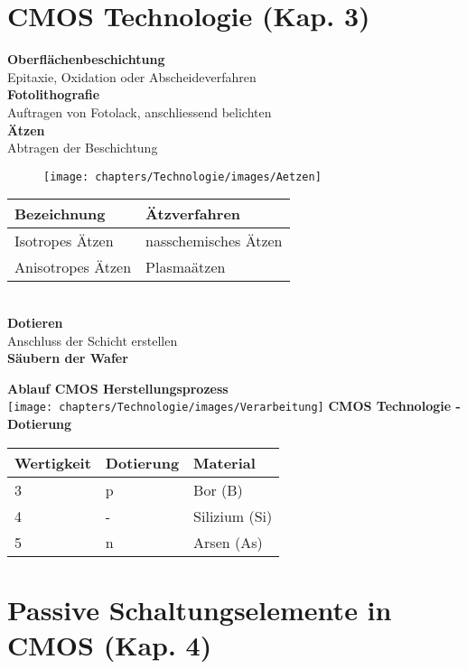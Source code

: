 
\section{CMOS Technologie (Kap. 3)}

\begin{minipage}[t]{0.5\textwidth}
	\textbf{Oberflächenbeschichtung}\\
	Epitaxie, Oxidation oder Abscheideverfahren\\ [2ex]
	\textbf{Fotolithografie}\\
	Auftragen von Fotolack, anschliessend belichten\\ [2ex]
	\textbf{Ätzen}\\
	Abtragen der Beschichtung
	\begin{figure}[H]
		\texttt{[image: chapters/Technologie/images/Aetzen]}
	\end{figure}
	\begin{tabular}{|l|l|}
		\hline
		\textbf{Bezeichnung}&\textbf{Ätzverfahren}\\ \hline
		Isotropes Ätzen&nasschemisches Ätzen\\ \hline
		Anisotropes Ätzen&Plasmaätzen\\ \hline
	\end{tabular}\\ [2ex]
	\textbf{Dotieren}\\
	Anschluss der Schicht erstellen\\ [2ex]
	\textbf{Säubern der Wafer}\\
\end{minipage}
\begin{minipage}[t]{0.5\textwidth}
	\textbf{Ablauf CMOS Herstellungsprozess}\\
	\texttt{[image: chapters/Technologie/images/Verarbeitung]}
	\textbf{CMOS Technologie - Dotierung}\\ 
	\begin{tabular}{|l|l|l|}
		\hline
		\textbf{Wertigkeit}&\textbf{Dotierung}&\textbf{Material}\\ \hline
		3&p&Bor (B)\\ \hline
		4&-&Silizium (Si)\\ \hline
		5&n&Arsen (As)\\ \hline
	\end{tabular}
\end{minipage}

\section{Passive Schaltungselemente in CMOS (Kap. 4)}

